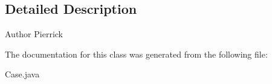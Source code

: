 \subsection{Detailed Description}
\begin{DoxyAuthor}{Author}
Pierrick 
\end{DoxyAuthor}


The documentation for this class was generated from the following file\+:\begin{DoxyCompactItemize}
\item 
Case.\+java\end{DoxyCompactItemize}
